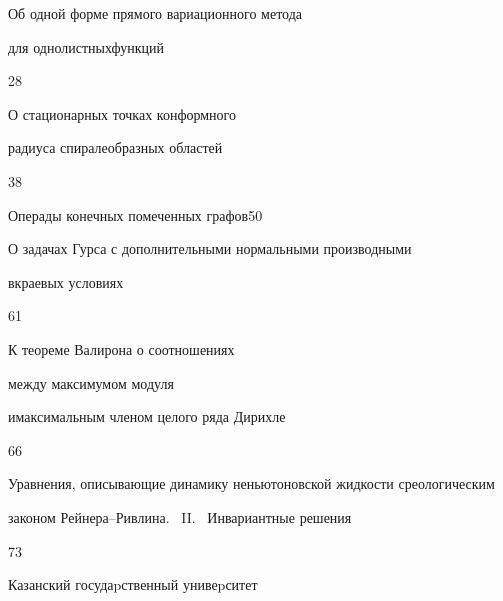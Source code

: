 

{Об одной форме прямого вариационного метода


для однолистных\newline функций}{28}




{О стационарных точках конформного 


радиуса спиралеобразных областей}{38}




{Операды конечных помеченных графов}{50}




{О задачах Гурса с дополнительными нормальными производными 


в\newline краевых условиях}{61}




{К теореме Валирона о соотношениях


между максимумом модуля


и\newline максимальным членом целого ряда Дирихле}{66}




{Уравнения, описывающие динамику неньютоновской жидкости с\newline реологическим 


законом Рейнера--Ривлина. \ II. \ Инвариантные решения}{73}














\vfill


\noindent\raisebox{2pt}{\copyright} Казанский госудаpственный унивеpситет





